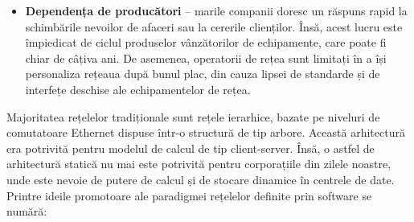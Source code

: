 \begin{itemize}
	\item \textbf{Dependența de producători} – marile companii doresc un răspuns rapid la schimbările nevoilor de afaceri sau la cererile clienților. Însă, acest lucru este împiedicat de ciclul produselor vânzătorilor de echipamente, care poate fi chiar de câțiva ani. De asemenea, operatorii de rețea sunt limitați în a își personaliza rețeaua după bunul plac, din cauza lipsei de standarde și de interfețe deschise ale echipamentelor de rețea.	
\end{itemize}

Majoritatea rețelelor tradiționale sunt rețele ierarhice, bazate pe niveluri de comutatoare Ethernet dispuse într-o structură de tip arbore. Această arhitectură era potrivită pentru modelul de calcul de tip client-server. Însă, o astfel de arhitectură statică nu mai este potrivită pentru corporațiile din zilele noastre, unde este nevoie de putere de calcul și de stocare dinamice în centrele de date. Printre ideile promotoare ale paradigmei rețelelor definite prin software se numără:
